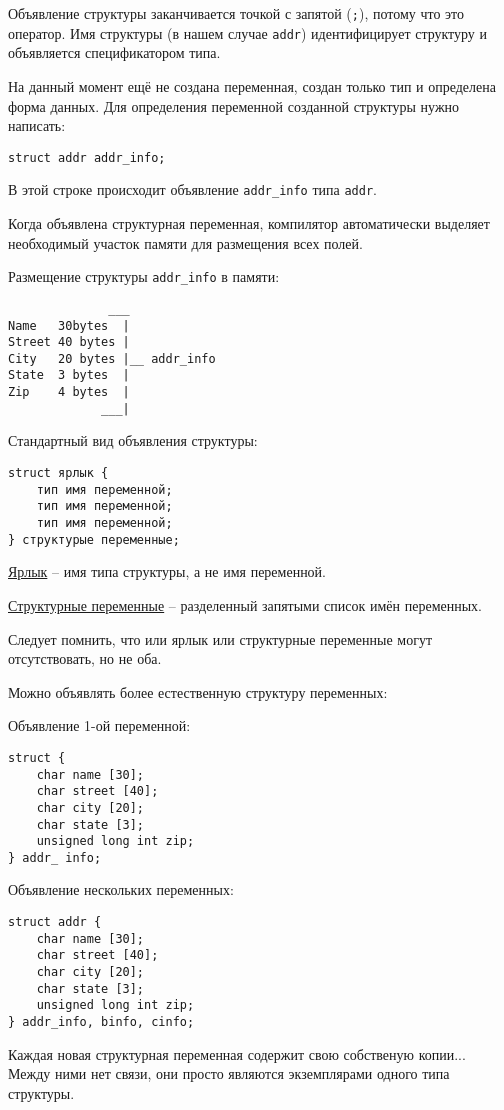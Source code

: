 Объявление структуры заканчивается точкой с запятой (\texttt{;}), потому что это оператор. Имя структуры (в нашем случае \texttt{addr}) идентифицирует структуру и объявляется спецификатором типа.

На данный момент ещё не создана переменная, создан только тип и определена форма данных. Для определения переменной созданной структуры нужно написать: 

\begin{verbatim}
struct addr addr_info; 
\end{verbatim}


В этой строке происходит объявление \texttt{addr\_info} типа \texttt{addr}.

Когда объявлена структурная переменная, компилятор автоматически выделяет необходимый участок памяти для размещения всех полей.

Размещение структуры \texttt{addr\_info} в памяти:

\begin{verbatim}
              ___
Name   30bytes  |
Street 40 bytes |
City   20 bytes |__ addr_info
State  3 bytes  |
Zip    4 bytes  |
             ___|
\end{verbatim}

Стандартный вид объявления структуры: 

\begin{verbatim}
struct ярлык {
    тип имя переменной;
    тип имя переменной;
    тип имя переменной;
} структурые переменные;
\end{verbatim}

\underline{Ярлык} – имя типа структуры, а не имя переменной.

\underline{Структурные переменные} – разделенный запятыми список имён переменных.

Следует помнить, что или ярлык или структурные переменные могут отсутствовать, но не оба.

Можно объявлять более естественную структуру переменных: 

Объявление 1-ой переменной: 

\begin{verbatim}
struct { 
    char name [30];
    сhar street [40];
    char city [20];
    char state [3];
    unsigned long int zip;
} addr_ info;
\end{verbatim}

Объявление нескольких переменных:

\begin{verbatim}
struct addr { 
    char name [30];
    сhar street [40];
    char city [20];
    char state [3];
    unsigned long int zip;
} addr_info, binfo, cinfo;
\end{verbatim}

Каждая новая структурная переменная содержит свою собственую копии... Между ними нет связи, они просто являются экземплярами одного типа структуры.